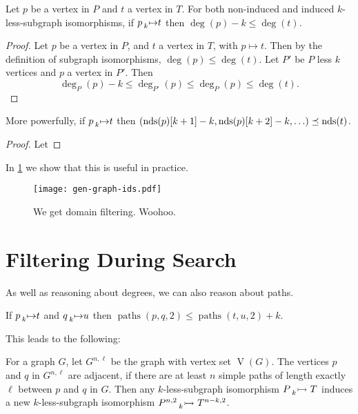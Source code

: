 \documentclass[letterpaper]{article}
\begin{document}

\begin{proposition}
    Let $p$ be a vertex in $P$ and $t$ a vertex in $T$. For both non-induced and induced
    $k$-less-subgraph isomorphisms, if $p \prescript{}{k}{\mapsto} t$ then
    $\deg(p) - k \le \deg(t)$.
\end{proposition}
\begin{proof}
Let $p$ be a vertex in $P$, and $t$ a vertex in $T$, with $p\mapsto t$. Then by the definition of subgraph isomorphisms, $\deg(p) \le \deg(t)$. Let $P'$ be $P$ less $k$ vertices and $p$ a vertex in $P'$. Then
\[
\deg_{P}(p)-k \le \deg_{P'}(p) \le \deg_{P}(p) \le \deg(t).
\]
\end{proof}

\begin{proposition}
    More powerfully, if $p \prescript{}{k}{\mapsto} t$ then
    $(\operatorname{nds}(p)[k+1] - k, \operatorname{nds}(p)[k+2] - k, \ldots) \preceq \operatorname{nds}(t)$.
\end{proposition}

\begin{proof}
Let

\end{proof}

In \cref{figure:ids} we show that this is useful in practice.

\begin{figure}
    \texttt{[image: gen-graph-ids.pdf]}
    \caption{We get domain filtering. Woohoo.}\label{figure:ids}
\end{figure}

\section{Filtering During Search}

As well as reasoning about degrees, we can also reason about paths.


\begin{proposition}
    If $p \prescript{}{k}{\mapsto} t$ and $q \prescript{}{k}{\mapsto} u$ then
     $\operatorname{paths}(p, q, 2) \le \operatorname{paths}(t, u, 2) + k$.
\end{proposition}

This leads to the following:

\begin{proposition}
    For a graph $G$, let $G^{n, \ell}$ be the graph with vertex set $\operatorname{V}(G)$. The
    vertices $p$ and $q$ in $G^{n, \ell}$ are adjacent, if there are at least $n$ simple paths of
    length exactly $\ell$ between $p$ and $q$ in $G$. Then any $k$-less-subgraph isomorphism
    $P \prescript{}{k}{\rightarrowtail}\  T$ induces a new $k$-less-subgraph isomorphism
    $P^{n, 2}\prescript{}{k}{\rightarrowtail}\  T^{n - k, 2}$.
\end{proposition}
\end{document}
